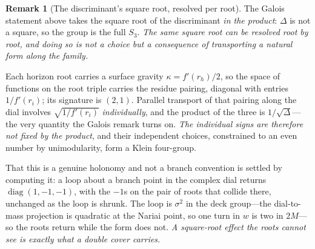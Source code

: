 \documentclass[11pt,a4paper]{article}
\theoremstyle{definition}
\newtheorem{remark}[theorem]{Remark}
\begin{document}
\begin{remark}[The discriminant's square root, resolved per root]\label{rem:perroot}
The Galois statement above takes the square root of the discriminant \emph{in the product}: $\Delta$ is not a
square, so the group is the full $S_{3}$. \emph{The same square root can be resolved root by root, and doing so
is not a choice but a consequence of transporting a natural form along the family.}

Each horizon root carries a surface gravity $\kappa=f'(r_{h})/2$, so the space of functions on the root triple
carries the residue pairing, diagonal with entries $1/f'(r_{i})$; its signature is $(2,1)$. Parallel transport
of that pairing along the dial involves $\sqrt{1/f'(r_{i})}$ \emph{individually}, and the product of the three
is $1/\sqrt{\Delta}$---the very quantity the Galois remark turns on. \emph{The individual signs are therefore
not fixed by the product}, and their independent choices, constrained to an even number by unimodularity, form
a Klein four-group.

That this is a genuine holonomy and not a branch convention is settled by computing it: a loop about a branch
point in the complex dial returns $\operatorname{diag}(1,-1,-1)$, with the $-1$s on the pair of roots that
collide there, unchanged as the loop is shrunk. The loop is $\sigma^{2}$ in the
deck group---the dial-to-mass projection is quadratic at the Nariai point, so one turn in $w$ is two in
$2M$---so the roots return while the form does not. \emph{A square-root
effect the roots cannot see is exactly what a double cover carries.}
\end{remark}
\end{document}
